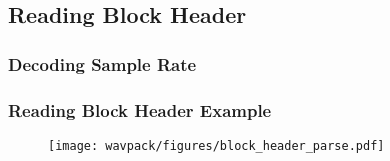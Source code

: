 \clearpage

\subsection{Reading Block Header}
\label{wavpack:read_block_header}
{
  
}

\clearpage

\subsubsection{Decoding Sample Rate}
\label{wavpack:decode_sample_rate}
{

}
\clearpage

\subsubsection{Reading Block Header Example}
\begin{figure}[h]
  \texttt{[image: wavpack/figures/block\_header\_parse.pdf]}
\end{figure}

